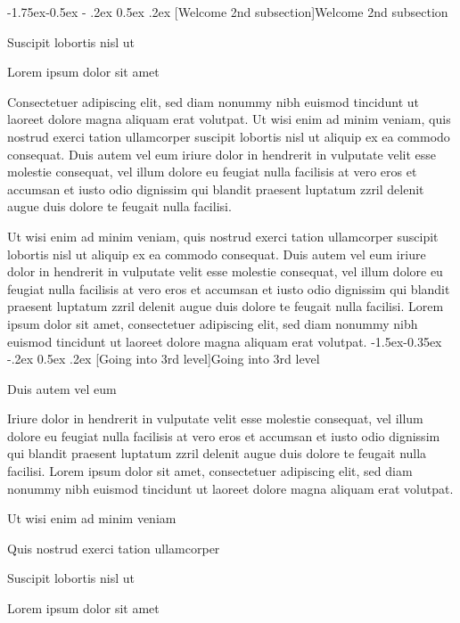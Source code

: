 \documentclass[11pt,twoside]{article}\makeatletter
\makeatletter
\renewcommand\subsection{\@startsection{subsection}{2}{\z@}%
     {-1.75ex\@plus -0.5ex \@minus- .2ex}%
     {0.5ex \@plus .2ex}%
     {\reset@font\Large\sffamily}}
\renewcommand\subsubsection{\@startsection{subsubsection}{3}{\z@}%
     {-1.5ex\@plus -0.35ex \@minus -.2ex}%
     {0.5ex \@plus .2ex}%
     {\reset@font\large\sffamily}}
\makeatother
\begin{document}
\subsection[{Welcome 2nd subsection}]{Welcome 2nd subsection}\par
Suscipit lobortis nisl ut \par
Lorem ipsum dolor sit amet\par
Consectetuer adipiscing elit, sed diam nonummy nibh euismod tincidunt ut laoreet dolore magna aliquam erat volutpat. Ut wisi enim ad minim veniam, quis nostrud exerci tation ullamcorper suscipit lobortis nisl ut aliquip ex ea commodo consequat. Duis autem vel eum iriure dolor in hendrerit in vulputate velit esse molestie consequat, vel illum dolore eu feugiat nulla facilisis at vero eros et accumsan et iusto odio dignissim qui blandit praesent luptatum zzril delenit augue duis dolore te feugait nulla facilisi.\par
Ut wisi enim ad minim veniam, quis nostrud exerci tation ullamcorper suscipit lobortis nisl ut aliquip ex ea commodo consequat. Duis autem vel eum iriure dolor in hendrerit in vulputate velit esse molestie consequat, vel illum dolore eu feugiat nulla facilisis at vero eros et accumsan et iusto odio dignissim qui blandit praesent luptatum zzril delenit augue duis dolore te feugait nulla facilisi. Lorem ipsum dolor sit amet, consectetuer adipiscing elit, sed diam nonummy nibh euismod tincidunt ut laoreet dolore magna aliquam erat volutpat. 
\subsubsection[{Going into 3rd level}]{Going into 3rd level}\par
Duis autem vel eum \par
Iriure dolor in hendrerit in vulputate velit esse molestie consequat, vel illum dolore eu feugiat nulla facilisis at vero eros et accumsan et iusto odio dignissim qui blandit praesent luptatum zzril delenit augue duis dolore te feugait nulla facilisi. Lorem ipsum dolor sit amet, consectetuer adipiscing elit, sed diam nonummy nibh euismod tincidunt ut laoreet dolore magna aliquam erat volutpat. \par
Ut wisi enim ad minim veniam\par
Quis nostrud exerci tation ullamcorper \par
Suscipit lobortis nisl ut \par
Lorem ipsum dolor sit amet
\end{document}
